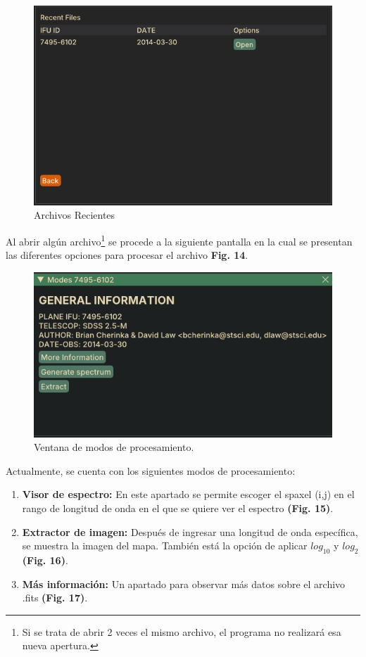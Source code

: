 \documentclass[9pt,twocolumn,a4paper]{opticajnl}
\begin{document}
\begin{figure}
    \centering
    \includegraphics[width=1\linewidth]{recent_files.png}
    \caption{Archivos Recientes}
    \label{fig:recent_files}
\end{figure}

Al abrir algún archivo\footnote{Si se trata de abrir 2 veces el mismo archivo, el programa no realizará esa nueva apertura.} se procede a la siguiente pantalla en la cual se presentan las diferentes opciones para procesar el archivo \textbf{Fig. 14}.

\begin{figure}
    \centering
    \includegraphics[width=1\linewidth]{modes.png}
    \caption{Ventana de modos de procesamiento.}
    \label{fig:modes}
\end{figure}

Actualmente, se cuenta con los siguientes modos de procesamiento:

\begin{enumerate}
    \item \textbf{Visor de espectro:} En este apartado se permite escoger el spaxel (i,j) en el rango de longitud de onda en el que se quiere ver el espectro \textbf{(Fig. 15)}.
    \item \textbf{Extractor de imagen:} Después de ingresar una longitud de onda específica, se muestra la imagen del mapa. También está la opción de aplicar $log_{10}$ y $log_{2}$ \textbf{(Fig. 16)}.
    \item \textbf{Más información:} Un apartado para observar más datos sobre el archivo .fits \textbf{(Fig. 17)}.
\end{enumerate}
\end{document}
